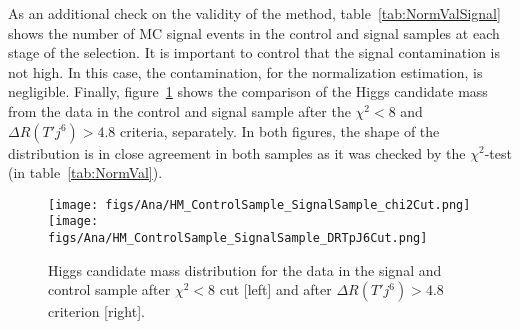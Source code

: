 As an additional check on the validity of the method, table~\ref{tab:NormValSignal} shows the number of MC signal events in the control and signal samples at each stage of the selection. It is important to control that the signal contamination is not high. In this case, the contamination, for the normalization estimation, is negligible. Finally, figure~\ref{fig:HiggsMassCSSS} shows the comparison of the Higgs candidate mass from the data in the control and signal sample after the $\chi^{2}<8$ and $ \Delta R (T' j^{6})>4.8$ criteria, separately. In both figures, the shape of the distribution is in close agreement in both samples as it was checked by the $\chi^{2}$-test (in table~\ref{tab:NormVal}). 

\begin{table*}[htbH]
\begin{center}
\caption{Signal MC events for 700 \GeVcc~mass point in the control and signal sample at each stage of the selection used for the estimation of background normalization method. The maximal contamination in the signal sample, after $ \Delta R (T' j^{6})>4.8$ criterion, is around 6\%. The maximal contamination in the control sample is less than 1\%.\label{tab:NormValSignal}}
\end{center}
\end{table*}

\begin{figure}[!Hhtbp]
  \begin{center}
    \texttt{[image: figs/Ana/HM\_ControlSample\_SignalSample\_chi2Cut.png]}
    \texttt{[image: figs/Ana/HM\_ControlSample\_SignalSample\_DRTpJ6Cut.png]}
    \caption{Higgs candidate mass distribution for the data in the signal and control sample after $\chi^{2}<8$ cut [left] and after $ \Delta R (T' j^{6})>4.8$ criterion [right].}
    \label{fig:HiggsMassCSSS}
  \end{center}
\end{figure}

